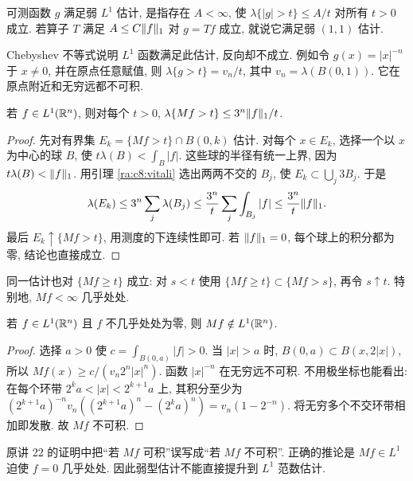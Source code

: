 \begin{definition}[弱 $L^1$ 估计]
可测函数 $g$ 满足弱 $L^1$ 估计, 是指存在 $A<\infty$, 使 $\lambda\{|g|>t\}\le A/t$ 对所有 $t>0$ 成立. 若算子 $T$ 满足 $A\le C\lVert f\rVert_1$ 对 $g=Tf$ 成立, 就说它满足弱 $(1,1)$ 估计.
\end{definition}

Chebyshev 不等式说明 $L^1$ 函数满足此估计, 反向却不成立. 例如令 $g(x)=|x|^{-n}$ 于 $x\ne0$, 并在原点任意赋值, 则 $\lambda\{g>t\}=v_n/t$, 其中 $v_n=\lambda(B(0,1))$. 它在原点附近和无穷远都不可积.

\begin{theorem}[最大函数的弱 $(1,1)$ 估计]\label{ra:c8:weak}
若 $f\in L^1(\mathbb R^n)$, 则对每个 $t>0$,
$\lambda\{Mf>t\}\le3^n\lVert f\rVert_1/t$.
\end{theorem}
\begin{proof}
先对有界集 $E_k=\{Mf>t\}\cap B(0,k)$ 估计. 对每个 $x\in E_k$, 选择一个以 $x$ 为中心的球 $B$, 使
$t\lambda(B)<\int_B|f|$.
这些球的半径有统一上界, 因为 $t\lambda(B)<\lVert f\rVert_1$. 用引理 \ref{ra:c8:vitali} 选出两两不交的 $B_j$, 使 $E_k\subset\bigcup_j3B_j$. 于是
\[
 \lambda(E_k)\le3^n\sum_j\lambda(B_j)
 \le\frac{3^n}{t}\sum_j\int_{B_j}|f|
 \le\frac{3^n}{t}\lVert f\rVert_1.
\]
最后 $E_k\uparrow\{Mf>t\}$, 用测度的下连续性即可. 若 $\lVert f\rVert_1=0$, 每个球上的积分都为零, 结论也直接成立.
\end{proof}

同一估计也对 $\{Mf\ge t\}$ 成立: 对 $s<t$ 使用 $\{Mf\ge t\}\subset\{Mf>s\}$, 再令 $s\uparrow t$. 特别地, $Mf<\infty$ 几乎处处.

\begin{proposition}
若 $f\in L^1(\mathbb R^n)$ 且 $f$ 不几乎处处为零, 则 $Mf\notin L^1(\mathbb R^n)$.
\end{proposition}
\begin{proof}
选择 $a>0$ 使 $c=\int_{B(0,a)}|f|>0$. 当 $|x|>a$ 时, $B(0,a)\subset B(x,2|x|)$, 所以
$Mf(x)\ge c/(v_n2^n|x|^n)$.
函数 $|x|^{-n}$ 在无穷远不可积. 不用极坐标也能看出: 在每个环带 $2^ka<|x|<2^{k+1}a$ 上, 其积分至少为
$(2^{k+1}a)^{-n}v_n((2^{k+1}a)^n-(2^ka)^n)=v_n(1-2^{-n})$.
将无穷多个不交环带相加即发散. 故 $Mf$ 不可积.
\end{proof}

\begin{remark}
原讲 22 的证明中把“若 $Mf$ 可积”误写成“若 $Mf$ 不可积”. 正确的推论是 $Mf\in L^1$ 迫使 $f=0$ 几乎处处. 因此弱型估计不能直接提升到 $L^1$ 范数估计.
\end{remark}


